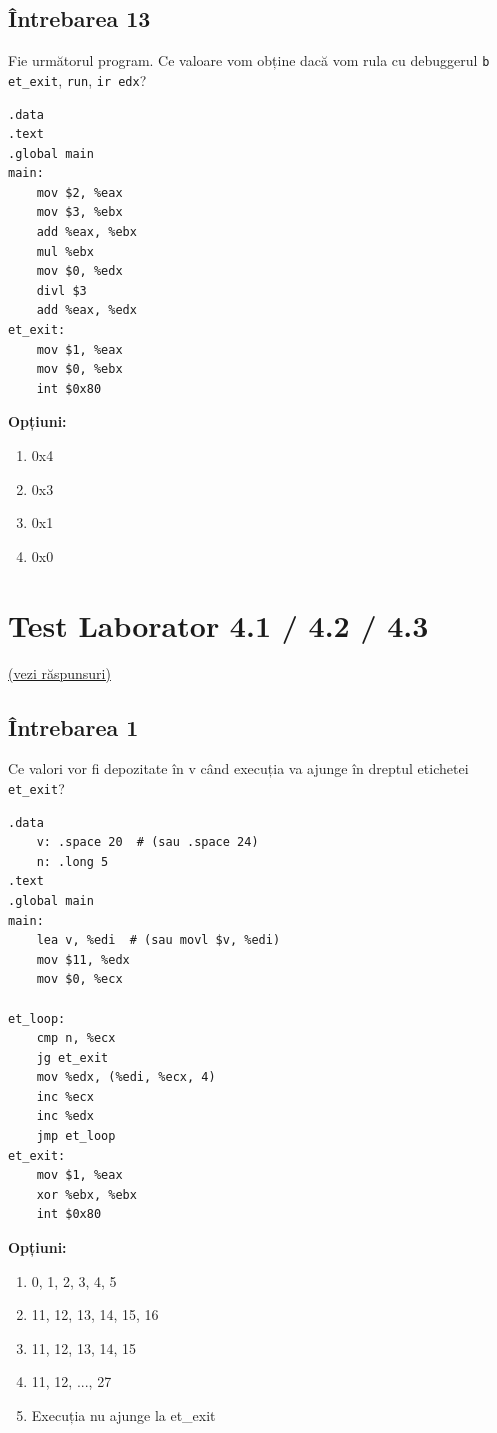 \documentclass[12pt,a4paper]{article}
\begin{document}
\subsection*{Întrebarea 13}
Fie următorul program. Ce valoare vom obține dacă vom rula cu debuggerul \texttt{b et\_exit}, \texttt{run}, \texttt{ir edx}?
\begin{lstlisting}[language=x86asm]
.data
.text
.global main
main:
    mov $2, %eax
    mov $3, %ebx
    add %eax, %ebx
    mul %ebx
    mov $0, %edx
    divl $3
    add %eax, %edx
et_exit:
    mov $1, %eax
    mov $0, %ebx
    int $0x80
\end{lstlisting}

\textbf{Opțiuni:}
\begin{multicols}{2}
\begin{enumerate}[label=\alph*)]
    \item 0x4 
    \item 0x3
    \item 0x1
    \item 0x0
\end{enumerate}
\end{multicols}

\section{Test Laborator 4.1 / 4.2 / 4.3} \label{sec:lab4} \hfill \hyperref[sec:rezolvari]{\small (vezi răspunsuri)}
\subsection*{Întrebarea 1}
Ce valori vor fi depozitate în v când execuția va ajunge în dreptul etichetei \texttt{et\_exit}?

\begin{multicols}{2}
\begin{lstlisting}[language=x86asm]
.data
    v: .space 20  # (sau .space 24)
    n: .long 5
.text
.global main
main:
    lea v, %edi  # (sau movl $v, %edi)
    mov $11, %edx
    mov $0, %ecx

et_loop:
    cmp n, %ecx
    jg et_exit
    mov %edx, (%edi, %ecx, 4) 
    inc %ecx
    inc %edx
    jmp et_loop
et_exit:
    mov $1, %eax
    xor %ebx, %ebx
    int $0x80
\end{lstlisting}
\end{multicols}

\textbf{Opțiuni:}
\begin{multicols}{2}
\begin{enumerate}[label=\alph*)]
    \item 0, 1, 2, 3, 4, 5
    \item 11, 12, 13, 14, 15, 16 
    \item 11, 12, 13, 14, 15
    \item 11, 12, ..., 27
    \item Execuția nu ajunge la et\_exit
\end{enumerate}
\end{multicols}
\end{document}

